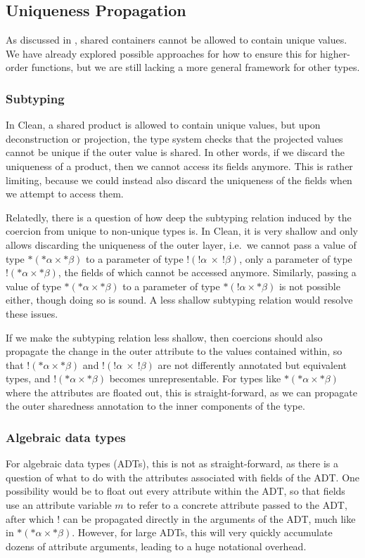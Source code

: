 \subsection{Uniqueness Propagation}
As discussed in , shared containers cannot be allowed to contain unique values. We have already explored possible approaches for how to ensure this for higher-order functions, but we are still lacking a more general framework for other types.

\subsubsection{Subtyping}
In Clean, a shared product is allowed to contain unique values, but upon deconstruction or projection, the type system checks that the projected values cannot be unique if the outer value is shared. In other words, if we discard the uniqueness of a product, then we cannot access its fields anymore. This is rather limiting, because we could instead also discard the uniqueness of the fields when we attempt to access them. 

Relatedly, there is a question of how deep the subtyping relation induced by the coercion from unique to non-unique types is. In Clean, it is very shallow and only allows discarding the uniqueness of the outer layer, i.e.\ we cannot pass a value of type $*(*\alpha \times *\beta)$ to a parameter of type $!(!\alpha\ \times\ !\beta)$, only a parameter of type $!(*\alpha \times *\beta)$, the fields of which cannot be accessed anymore. Similarly, passing a value of type $*(*\alpha \times *\beta)$ to a parameter of type $*(!\alpha \times *\beta)$ is not possible either, though doing so is sound. A less shallow subtyping relation would resolve these issues.

If we make the subtyping relation less shallow, then coercions should also propagate the change in the outer attribute to the values contained within, so that $!(*\alpha \times *\beta)$ and $!(!\alpha\ \times\ !\beta)$ are not differently annotated but equivalent types, and $!(*\alpha \times *\beta)$ becomes unrepresentable. For types like $*(*\alpha \times *\beta)$ where the attributes are floated out, this is straight-forward, as we can propagate the outer sharedness annotation to the inner components of the type.

\subsubsection{Algebraic data types}
For algebraic data types (ADTs), this is not as straight-forward, as there is a question of what to do with the attributes associated with fields of the ADT. One possibility would be to float out every attribute within the ADT, so that fields use an attribute variable $m$ to refer to a concrete attribute passed to the ADT, after which $!$ can be propagated directly in the arguments of the ADT, much like in $*(*\alpha \times *\beta)$. However, for large ADTs, this will very quickly accumulate dozens of attribute arguments, leading to a huge notational overhead.


